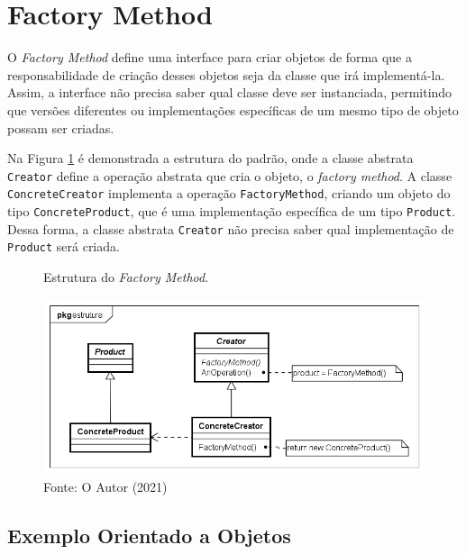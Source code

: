 
\section{Factory Method}

O \textit{Factory Method} define uma interface para criar 
objetos de forma que a responsabilidade de criação 
desses objetos seja da classe que irá implementá-la. 
Assim, a interface não precisa saber qual 
classe deve ser instanciada, permitindo que versões 
diferentes ou implementações específicas de um mesmo 
tipo de objeto possam ser criadas.\cite{gamma:1995}

Na Figura \ref{fmethod_struct} é demonstrada 
a estrutura do padrão, onde a classe abstrata \texttt{Creator} 
define a operação abstrata que cria o objeto, 
o \textit{factory method}. A classe \texttt{ConcreteCreator} 
implementa a operação \texttt{FactoryMethod}, criando um objeto 
do tipo \texttt{ConcreteProduct}, que é uma implementação 
específica de um tipo \texttt{Product}. Dessa forma, a classe 
abstrata \texttt{Creator} não precisa saber qual implementação 
de \texttt{Product} será criada.

\begin{figure}[htb]
	\caption{\label{fmethod_struct}Estrutura do \textit{Factory Method}.}
	\begin{center}
	    \includegraphics[scale=0.5]{5_padroes-contexto-funcional/5.1_criacionais/5.1.1_factory-method/factorymethod_struct.png}
	\end{center}
  \caption*{Fonte: O Autor (2021)}
\end{figure}


\subsection*{Exemplo Orientado a Objetos}

